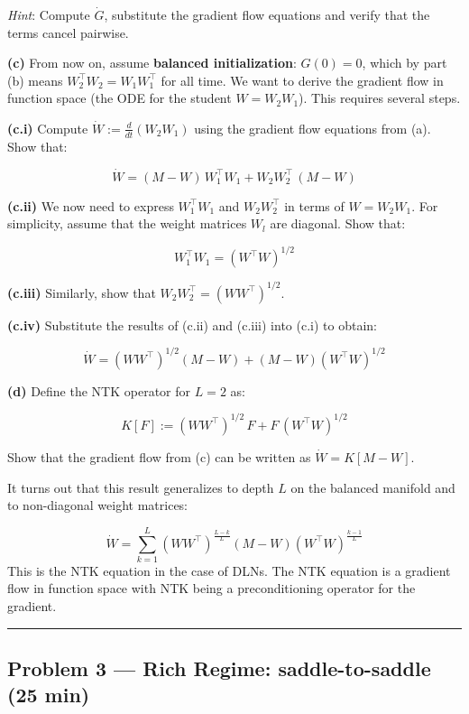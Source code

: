 \documentclass[
]{article}
\begin{document}
\emph{Hint}: Compute
\(\dot{G}\),
substitute the gradient flow equations and verify that the
terms cancel pairwise.

\textbf{(c)} From now on, assume \textbf{balanced initialization}:
\(G(0) = 0\), which by part (b) means \(W_2^\top W_2 = W_1 W_1^\top\)
for all time. We want to derive the gradient flow in function space (the
ODE for the student \(W = W_2 W_1\)). This requires several steps.

\textbf{(c.i)} Compute \(\dot{W} := \frac{d}{dt}(W_2 W_1)\) using the
gradient flow equations from (a). Show that:

\[\dot{W} = (M - W)\, W_1^\top W_1 + W_2 W_2^\top\, (M - W)\]

\textbf{(c.ii)} We now need to express \(W_1^\top W_1\) and
\(W_2 W_2^\top\) in terms of \(W = W_2 W_1\). For simplicity, assume
that the weight matrices \(W_l\) are diagonal. Show that:

\[W_1^\top W_1 = (W^\top W)^{1/2}\]

\textbf{(c.iii)} Similarly, show that
\(W_2 W_2^\top = (W W^\top)^{1/2}\).

\textbf{(c.iv)} Substitute the results of (c.ii) and (c.iii) into (c.i)
to obtain:

\[\dot{W} = (W W^\top)^{1/2}(M - W) + (M - W)(W^\top W)^{1/2}\]

\textbf{(d)} Define the NTK operator for \(L = 2\) as:

\[K[F] := (WW^\top)^{1/2}\, F + F\, (W^\top W)^{1/2}\]

Show that the gradient flow from (c) can be written as
\(\dot{W} = K[M - W]\).

It turns out that this result generalizes to depth \(L\) on the balanced
manifold and to non-diagonal weight matrices:

\[\dot{W} = \sum_{k=1}^{L} (WW^\top)^{\frac{L-k}{L}} (M - W) (W^\top W)^{\frac{k-1}{L}}\]
This is the NTK equation in the case of DLNs. The NTK equation is a gradient flow in function space with NTK being a preconditioning operator for the gradient.
\begin{center}\rule{0.5\linewidth}{0.5pt}\end{center}

\subsection{Problem 3 --- Rich Regime: saddle-to-saddle (25
min)}\label{problem-3-rich-regime-incremental-learning-25-min}
\end{document}
